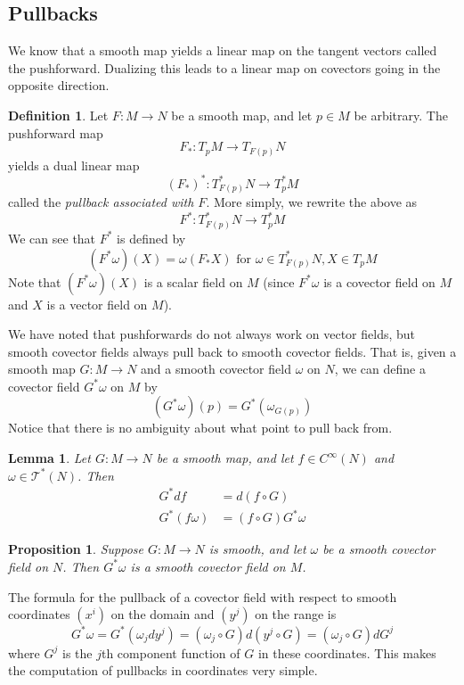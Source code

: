 \documentclass{article}
\newtheorem{proposition}[theorem]{Proposition}
\newtheorem{lemma}[theorem]{Lemma}
\theoremstyle{remark}
\theoremstyle{definition}
\newtheorem{definition}{Definition}[section]
\begin{document}
\subsection{Pullbacks}
We know that a smooth map yields a linear map on the tangent vectors called the pushforward. Dualizing this leads to a linear map on covectors going in the opposite direction. 

\begin{definition}
Let $F: M \longrightarrow N$ be a smooth map, and let $p \in M$ be arbitrary. The pushforward map
\[F_* :T_p M \longrightarrow T_{F(p)} N\]
yields a dual linear map 
\[(F_*)^* : T_{F(p)}^* N \longrightarrow T_p^* M\]
called the \textit{pullback associated with $F$}. More simply, we rewrite the above as
\[F^*:T_{F(p)}^* N \longrightarrow T_p^* M\]
We can see that $F^*$ is defined by 
\[(F^* \omega)(X) = \omega (F_* X) \text{ for } \omega \in T^*_{F(p)} N, X \in T_p M\]
Note that $(F^* \omega)(X)$ is a scalar field on $M$ (since $F^* \omega$ is a covector field on $M$ and $X$ is a vector field on $M$). 
\end{definition}

We have noted that pushforwards do not always work on vector fields, but smooth covector fields always pull back to smooth covector fields. That is, given a smooth map $G: M \longrightarrow N$ and a smooth covector field $\omega$ on $N$, we can define a covector field $G^* \omega$ on $M$ by 
\[(G^* \omega) (p) = G^* (\omega_{G(p)})\]
Notice that there is no ambiguity about what point to pull back from. 

\begin{lemma}
Let $G: M \longrightarrow N$ be a smooth map, and let $f \in C^\infty(N)$ and $\omega \in \mathcal{T}^* (N)$. Then 
\begin{align*}
    G^* df & = d (f \circ G) \\
    G^* (f \omega) & = (f \circ G) G^* \omega 
\end{align*}
\end{lemma}

\begin{proposition}
Suppose $G: M \longrightarrow N$ is smooth, and let $\omega$ be a smooth covector field on $N$. Then $G^* \omega$ is a smooth covector field on $M$. 
\end{proposition}

The formula for the pullback of a covector field with respect to smooth coordinates $(x^i)$ on the domain and $(y^j)$ on the range is
\[G^* \omega = G^* (\omega_j dy^j) = (\omega_j \circ G) d(y^j \circ G) = (\omega_j \circ G) dG^j\]
where $G^j$ is the $j$th component function of $G$ in these coordinates. This makes the computation of pullbacks in coordinates very simple. 
\end{document}
